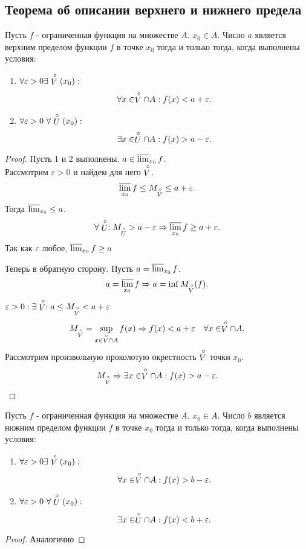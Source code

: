 \documentclass[12pt]{report}
\begin{document}
\subsection{Теорема об описании верхнего и нижнего предела}\label{ques_31}
\begin{thm}
    Пусть $f$ - ограниченная функция на множестве $A$. $x_0 \in A$. Число $a$ является верхним пределом функции $f$ в точке $x_0$ тогда и только тогда, когда выполнены условия:
    \begin{enumerate}
	\item $\forall \varepsilon >0 \exists \stackrel \circ V (x_0):$ 
	    \[
		\forall x \in  \stackrel \circ V \cap A: f(x) < a + \varepsilon 
	    .\] 
	\item $\forall \varepsilon >0 ~ \forall \stackrel \circ  U(x_0):$
	    \[
		\exists x \in \stackrel \circ U\cap A: f(x) > a -\varepsilon 
	    .\] 
    \end{enumerate}
\end{thm}
\begin{proof}
    Пусть 1 и 2 выполнены. $a \in  \varlimsup_{x_0} f$.\\
    Рассмотрим $\varepsilon >0$ и найдем для него $\stackrel \circ V$.
    \[
	\varlimsup_{x_0}f \le  M_{\stackrel \circ V} \le a + \varepsilon 
    .\] 
Тогда $\varlimsup_{x_0} \le a$.
\[
    \forall \stackrel \circ U: M_{\stackrel \circ U} > a - \varepsilon  \Rightarrow \varlimsup_{x_0} f \ge  a+ \varepsilon 
.\] 
Так как $\varepsilon $ любое, $\varlimsup_{x_0} f \ge a$

Теперь в обратную сторону. Пусть $a = \varlimsup_{x_0} f$.
\[
    a = \varlimsup_{x_0} f \Rightarrow a = 
    \inf M_{\stackrel \circ V} (f)
.\] 
$\varepsilon >0 : \exists \stackrel \circ V: a \le M_{\stackrel \circ V} < a+ \varepsilon $
\[
    M_{\stackrel \circ V} = \sup\limits_{x \in \stackrel \circ V \cap A} f(x) \Rightarrow f(x) < a + \varepsilon \quad \forall x \in \stackrel \circ V \cap A
.\] 
Рассмотрим произвольную проколотую окрестность $\stackrel \circ  V$ точки $x_0$.
\[
    M_{\stackrel \circ V} \Rightarrow  \exists x \in  \stackrel \circ V \cap A: f(x) > a- \varepsilon 
.\] 
\end{proof}
\begin{thm}
    Пусть $f$ - ограниченная функция на множестве $A$. $x_0 \in A$. Число $b$ является нижним пределом функции $f$ в точке $x_0$ тогда и только тогда, когда выполнены условия:
    \begin{enumerate}
	\item $\forall \varepsilon >0 \exists \stackrel \circ V (x_0):$ 
	    \[
		\forall x \in  \stackrel \circ V \cap A: f(x) > b - \varepsilon 
	    .\] 
	\item $\forall \varepsilon >0 ~ \forall \stackrel \circ  U(x_0):$
	    \[
		\exists x \in \stackrel \circ U\cap A: f(x) < b + \varepsilon 
	    .\] 
    \end{enumerate}
\end{thm}
\begin{proof}
    Аналогично
\end{proof}
\end{document}
